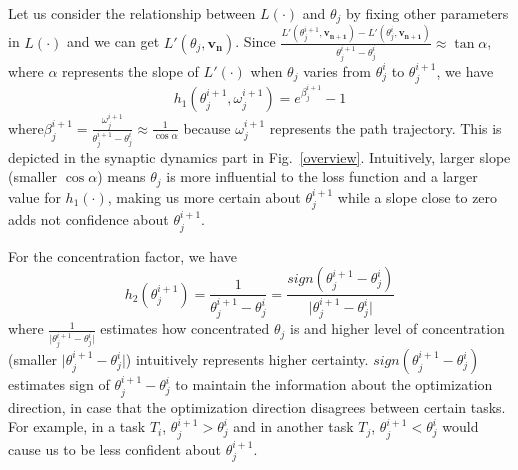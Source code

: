 Let us consider the relationship between $L(\cdot)$ and $\theta_j$ by fixing other parameters in $L(\cdot)$ and we can get $L'(\theta_j, \bm{v_n})$.
Since $\frac{L'(\theta_j^{i+1}, \bm{v_{n+1}}) - L'(\theta_j^i, \bm{v_{n+1}})}{\theta_j^{i+1} - \theta_j^{i}} \approx \tan \alpha$, where $\alpha$ represents the slope of $L'(\cdot)$ when $\theta_j$ varies from $\theta_j^i$ to $\theta_j^{i+1}$, we have 
\begin{equation}
h_1(\theta_j^{i+1}, \omega_j^{i+1}) = e^{\beta_j^{i+1}} - 1
\end{equation}
where$\beta_j^{i+1} = \frac{\omega_j^{i+1}}{\theta_j^{i+1}- \theta_j^{i}} \approx \frac{1}{\cos \alpha}$
because $\omega_j^{i+1}$ represents the path trajectory. This is depicted in the synaptic dynamics part in Fig.~\ref*{overview}. 
Intuitively, larger slope (smaller $\cos \alpha$) means $\theta_j$ is more influential to the loss function and a larger value for $h_1(\cdot)$, making us more certain about $\theta_j^{i+1}$ while a slope close to zero adds not confidence about $\theta_j^{i+1}$.

For the concentration factor, we have \begin{equation} 
    h_2(\theta_j^{i+1})=\frac{1}{\theta_j^{i+1} - \theta_j^{i}} = \frac{sign(\theta_j^{i+1} - \theta_j^{i})}{\lvert \theta_j^{i+1} - \theta_j^{i} \rvert}
\end{equation}
where $\frac{1}{\lvert \theta_j^{i+1} - \theta_j^{i} \rvert}$ estimates how concentrated $\theta_j$ is and higher level of concentration (smaller $\lvert \theta_j^{i+1} - \theta_j^{i} \rvert$) intuitively represents higher certainty.
$sign(\theta_j^{i+1} - \theta_j^{i})$ estimates sign of $\theta_j^{i+1} - \theta_j^{i}$ to maintain the information about the optimization direction, in case that the optimization direction disagrees between certain tasks. 
For example, in a task $T_i$, $\theta_j^{i+1} > \theta_j^{i}$ and in another task $T_j$, $\theta_j^{i+1} < \theta_j^{i}$ would cause us to be less confident about $\theta_j^{i+1}$.

